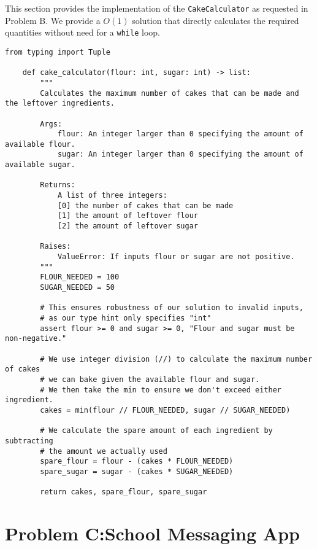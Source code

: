 \documentclass{solutionclass} %
\begin{document}
    \begin{solution}
    This section provides the implementation of the \texttt{CakeCalculator} as requested in Problem B. We provide a $O(1)$ solution that directly calculates the required quantities without need for a \texttt{while} loop.

    \begin{lstlisting}[style=pythonstyle]
    from typing import Tuple

    def cake_calculator(flour: int, sugar: int) -> list:
        """
        Calculates the maximum number of cakes that can be made and the leftover ingredients.
        
        Args:
            flour: An integer larger than 0 specifying the amount of available flour.
            sugar: An integer larger than 0 specifying the amount of available sugar.
            
        Returns:
            A list of three integers: 
            [0] the number of cakes that can be made
            [1] the amount of leftover flour
            [2] the amount of leftover sugar
            
        Raises:
            ValueError: If inputs flour or sugar are not positive.
        """
        FLOUR_NEEDED = 100
        SUGAR_NEEDED = 50

        # This ensures robustness of our solution to invalid inputs, 
        # as our type hint only specifies "int"
        assert flour >= 0 and sugar >= 0, "Flour and sugar must be non-negative."

        # We use integer division (//) to calculate the maximum number of cakes
        # we can bake given the available flour and sugar.
        # We then take the min to ensure we don't exceed either ingredient.
        cakes = min(flour // FLOUR_NEEDED, sugar // SUGAR_NEEDED)

        # We calculate the spare amount of each ingredient by subtracting
        # the amount we actually used
        spare_flour = flour - (cakes * FLOUR_NEEDED)
        spare_sugar = sugar - (cakes * SUGAR_NEEDED)

        return cakes, spare_flour, spare_sugar
    \end{lstlisting}
    \end{solution}

    \divider%

    \section{Problem C:\@ School Messaging App}
\end{document}
